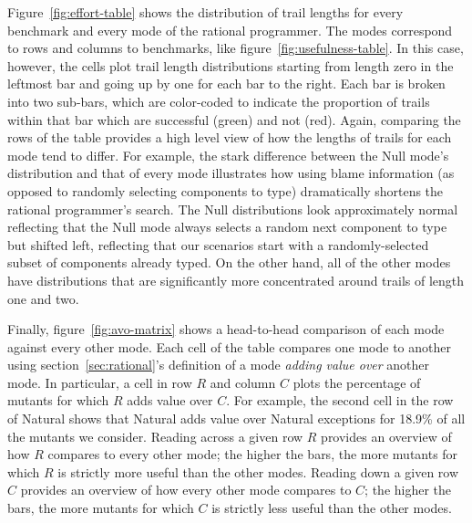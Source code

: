 Figure~\ref{fig:effort-table} shows the distribution of trail lengths for every benchmark and every mode of the rational programmer.
The modes correspond to rows and columns to benchmarks, like figure~\ref{fig:usefulness-table}.
In this case, however, the cells plot trail length distributions starting from length zero in the leftmost bar and going up by one for each bar to the right.
Each bar is broken into two sub-bars, which are color-coded to indicate the proportion of trails within that bar which are successful (green) and not (red).
Again, comparing the rows of the table provides a high level view of how the lengths of trails for each mode tend to differ.
For example, the stark difference between the Null mode's distribution and that of every mode illustrates how using blame information (as opposed to randomly selecting components to type) dramatically shortens the rational programmer's search.
The Null distributions look approximately normal \emdash reflecting that the Null mode always selects a random next component to type \emdash but shifted left, reflecting that our scenarios start with a randomly-selected subset of components already typed.
On the other hand, all of the other modes have distributions that are significantly more concentrated around trails of length one and two.

Finally, figure~\ref{fig:avo-matrix} shows a head-to-head comparison of each mode against every other mode.
Each cell of the table compares one mode to another using section~\ref{sec:rational}'s definition of a mode \emph{adding value over} another mode.
In particular, a cell in row $R$ and column $C$ plots the percentage of mutants for which $R$ adds value over $C$.
For example, the second cell in the row of Natural shows that Natural adds value over Natural exceptions for 18.9\% of all the mutants we consider.
Reading across a given row $R$ provides an overview of how $R$ compares to every other mode;
the higher the bars, the more mutants for which $R$ is strictly more useful than the other modes.
Reading down a given row $C$ provides an overview of how every other mode compares to $C$;
the higher the bars, the more mutants for which $C$ is strictly less useful than the other modes.

